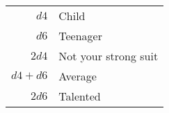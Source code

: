 \begin{tabular}{rl}
$d4$ & Child \\
$d6$ & Teenager \\
$2d4$ & Not your strong suit \\
$d4+d6$ & Average \\
$2d6$ & Talented \\
\end{tabular}